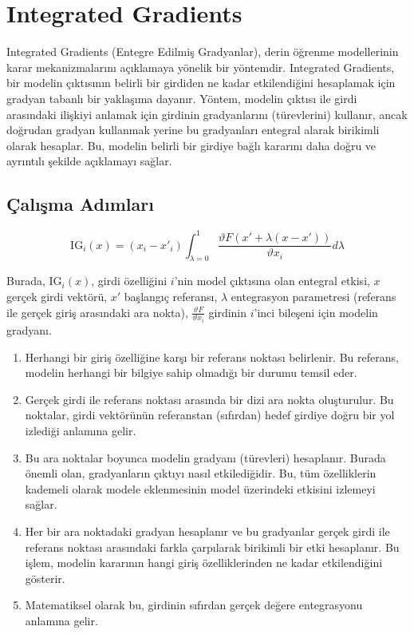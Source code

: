 \section{Integrated Gradients}

Integrated Gradients (Entegre Edilmiş Gradyanlar), derin öğrenme modellerinin karar mekanizmalarını açıklamaya yönelik bir yöntemdir. Integrated Gradients, bir modelin çıktısının belirli bir girdiden ne kadar etkilendiğini hesaplamak için gradyan tabanlı bir yaklaşıma dayanır. Yöntem, modelin çıktısı ile girdi arasındaki ilişkiyi anlamak için girdinin gradyanlarını (türevlerini) kullanır, ancak doğrudan gradyan kullanmak yerine bu gradyanları entegral alarak birikimli olarak hesaplar. Bu, modelin belirli bir girdiye bağlı kararını daha doğru ve ayrıntılı şekilde açıklamayı sağlar.

\subsection{Çalışma Adımları}

\[ \text{IG}_{i} (x) = (x_i - {x'}_i) \int_{\lambda=0}^{1} \frac{\vartheta F(x' + \lambda (x - x'))}{\vartheta x_i} d\lambda \]

Burada, $\text{IG}_{i} (x)$, girdi özelliğini $i$'nin model çıktısına olan entegral etkisi, $x$ gerçek girdi vektörü, $x'$ başlangıç referansı, $\lambda$ entegrasyon parametresi (referans ile gerçek giriş arasındaki ara nokta), $\frac{\vartheta F}{\vartheta x_i}$ girdinin $i$'inci bileşeni için modelin gradyanı.

\begin{enumerate}
    \item Herhangi bir giriş özelliğine karşı bir referans noktası belirlenir. Bu referans, modelin herhangi bir bilgiye sahip olmadığı bir durumu temsil eder.
    \item Gerçek girdi ile referans noktası arasında bir dizi ara nokta oluşturulur. Bu noktalar, girdi vektörünün referanstan (sıfırdan) hedef girdiye doğru bir yol izlediği anlamına gelir.
    \item Bu ara noktalar boyunca modelin gradyanı (türevleri) hesaplanır. Burada önemli olan, gradyanların çıktıyı nasıl etkilediğidir. Bu, tüm özelliklerin kademeli olarak modele eklenmesinin model üzerindeki etkisini izlemeyi sağlar.
    \item Her bir ara noktadaki gradyan hesaplanır ve bu gradyanlar gerçek girdi ile referans noktası arasındaki farkla çarpılarak birikimli bir etki hesaplanır. Bu işlem, modelin kararının hangi giriş özelliklerinden ne kadar etkilendiğini gösterir.
    \item Matematiksel olarak bu, girdinin sıfırdan gerçek değere entegrasyonu anlamına gelir.
\end{enumerate}

\newpage